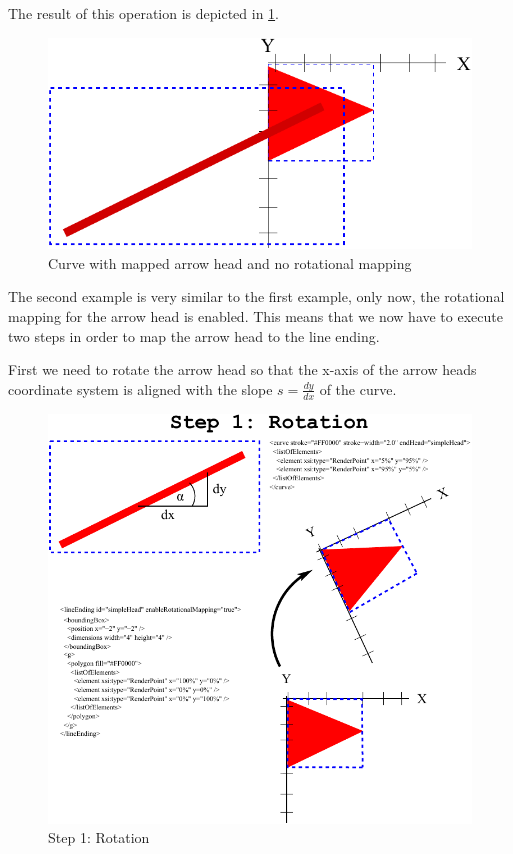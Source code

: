The result of this operation is depicted in \ref{fig:3ArrowHeadMapping}.

\begin{figure}[!ht]
\begin{center}
\includegraphics{figures/ArrowHeadMapping3.pdf}
\end{center}
\caption{Curve with mapped arrow head and no rotational mapping} \label{fig:3ArrowHeadMapping}
\end{figure}

The second example is very similar to the first example, only now, the rotational mapping for the arrow head is enabled.
This means that we now have to execute two steps in order to map the arrow head to the line ending.

First we need to rotate the arrow head so that the x-axis of the arrow heads coordinate system is aligned with the slope $s=\frac{dy}{dx}$ of the curve.

\begin{figure}[!ht]
\begin{center}
\includegraphics{figures/ArrowHeadMapping6.pdf}
\end{center}
\caption{Step 1: Rotation}
\label{ArrowHeadMapping6}
\end{figure}

